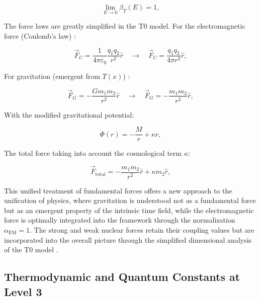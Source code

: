 \documentclass[twocolumn,aps,prl]{revtex4-2}
\begin{document}
	\begin{equation}
		\lim_{E \to 0} \beta_T(E) = 1, \label{eq:beta_IR_limit}
	\end{equation}
	
	The force laws are greatly simplified in the T0 model. For the electromagnetic force (Coulomb’s law) \cite{Feynman1985}:
	
	\begin{equation}
		\vec{F}_C = \frac{1}{4\pi \varepsilon_0} \frac{q_1 q_2}{r^2} \hat{r} \quad \to \quad \vec{F}_C = \frac{q_1 q_2}{4\pi r^2} \hat{r}, \label{eq:coulomb_t0}
	\end{equation}
	
	For gravitation (emergent from $T(x)$) \cite{pascher_emergente_2025}:
	
	\begin{equation}
		\vec{F}_G = -\frac{G m_1 m_2}{r^2} \hat{r} \quad \to \quad \vec{F}_G = -\frac{m_1 m_2}{r^2} \hat{r}, \label{eq:gravity_t0}
	\end{equation}
	
	With the modified gravitational potential:
	
	\begin{equation}
		\Phi(r) = -\frac{M}{r} + \kappa r, \label{eq:detailed_mod_potential}
	\end{equation}
	
	The total force taking into account the cosmological term $\kappa$:
	
	\begin{equation}
		\vec{F}_{\text{total}} = -\frac{m_1 m_2}{r^2} \hat{r} + \kappa m_2 \hat{r}, \label{eq:total_force}
	\end{equation}
	
	This unified treatment of fundamental forces offers a new approach to the unification of physics, where gravitation is understood not as a fundamental force but as an emergent property of the intrinsic time field, while the electromagnetic force is optimally integrated into the framework through the normalization $\alpha_{\text{EM}} = 1$. The strong and weak nuclear forces retain their coupling values but are incorporated into the overall picture through the simplified dimensional analysis of the T0 model \cite{pascher_emergente_2025}.
	
	\subsection{Thermodynamic and Quantum Constants at Level 3}
	\label{subsec:level3_thermo_quantum}
	
\end{document}
